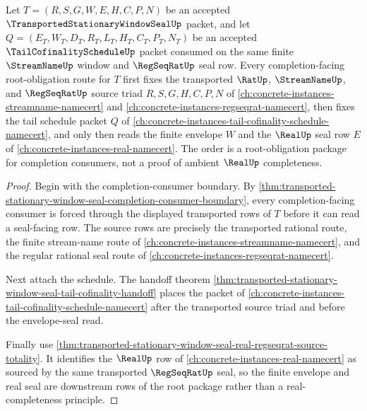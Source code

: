 \begin{theorem}
\label{thm:transported-stationary-window-seal-root-completion-source-order}
Let $T=(R,S,G,W,E,H,C,P,N)$ be an accepted $\TransportedStationaryWindowSealUp$ packet, and let $Q=(E_T,W_T,D_T,R_T,L_T,H_T,C_T,P_T,N_T)$ be an accepted $\TailCofinalityScheduleUp$ packet consumed on the same finite $\StreamNameUp$ window and $\RegSeqRatUp$ seal row. Every completion-facing root-obligation route for $T$ first fixes the transported $\RatUp$, $\StreamNameUp$, and $\RegSeqRatUp$ source triad $R,S,G,H,C,P,N$ of \autoref{ch:concrete-instances-streamname-namecert} and \autoref{ch:concrete-instances-regseqrat-namecert}, then fixes the tail schedule packet $Q$ of \autoref{ch:concrete-instances-tail-cofinality-schedule-namecert}, and only then reads the finite envelope $W$ and the $\RealUp$ seal row $E$ of \autoref{ch:concrete-instances-real-namecert}. The order is a root-obligation package for completion consumers, not a proof of ambient $\RealUp$ completeness.
\end{theorem}
\begin{proof}
Begin with the completion-consumer boundary. By \autoref{thm:transported-stationary-window-seal-completion-consumer-boundary}, every completion-facing consumer is forced through the displayed transported rows of $T$ before it can read a seal-facing row. The source rows are precisely the transported rational route, the finite stream-name route of \autoref{ch:concrete-instances-streamname-namecert}, and the regular rational seal route of \autoref{ch:concrete-instances-regseqrat-namecert}.

Next attach the schedule. The handoff theorem \autoref{thm:transported-stationary-window-seal-tail-cofinality-handoff} places the packet of \autoref{ch:concrete-instances-tail-cofinality-schedule-namecert} after the transported source triad and before the envelope-seal read.

Finally use \autoref{thm:transported-stationary-window-seal-real-regseqrat-source-totality}. It identifies the $\RealUp$ row of \autoref{ch:concrete-instances-real-namecert} as sourced by the same transported $\RegSeqRatUp$ seal, so the finite envelope and real seal are downstream rows of the root package rather than a real-completeness principle.
\end{proof}

